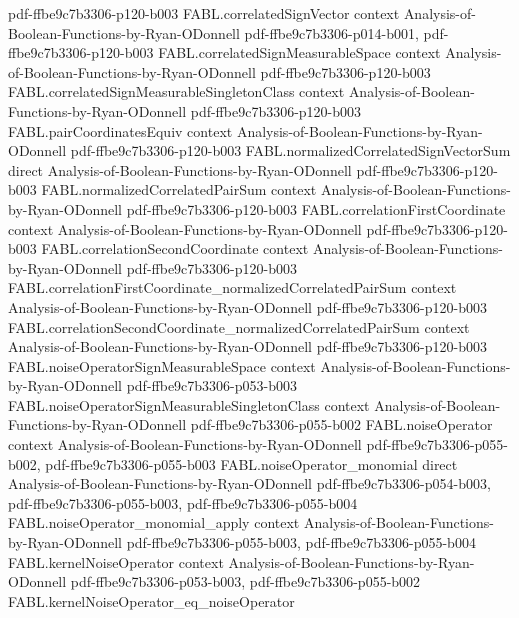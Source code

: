 \begin{theorem}
{    pdf-ffbe9c7b3306-p120-b003}
\proofstep
  {FABL.correlatedSignVector}
  {context}
  {Analysis-of-Boolean-Functions-by-Ryan-ODonnell}
  {pdf-ffbe9c7b3306-p014-b001,
    pdf-ffbe9c7b3306-p120-b003}
\proofstep
  {FABL.correlatedSignMeasurableSpace}
  {context}
  {Analysis-of-Boolean-Functions-by-Ryan-ODonnell}
  {pdf-ffbe9c7b3306-p120-b003}
\proofstep
  {FABL.correlatedSignMeasurableSingletonClass}
  {context}
  {Analysis-of-Boolean-Functions-by-Ryan-ODonnell}
  {pdf-ffbe9c7b3306-p120-b003}
\proofstep
  {FABL.pairCoordinatesEquiv}
  {context}
  {Analysis-of-Boolean-Functions-by-Ryan-ODonnell}
  {pdf-ffbe9c7b3306-p120-b003}
\proofstep
  {FABL.normalizedCorrelatedSignVectorSum}
  {direct}
  {Analysis-of-Boolean-Functions-by-Ryan-ODonnell}
  {pdf-ffbe9c7b3306-p120-b003}
\proofstep
  {FABL.normalizedCorrelatedPairSum}
  {context}
  {Analysis-of-Boolean-Functions-by-Ryan-ODonnell}
  {pdf-ffbe9c7b3306-p120-b003}
\proofstep
  {FABL.correlationFirstCoordinate}
  {context}
  {Analysis-of-Boolean-Functions-by-Ryan-ODonnell}
  {pdf-ffbe9c7b3306-p120-b003}
\proofstep
  {FABL.correlationSecondCoordinate}
  {context}
  {Analysis-of-Boolean-Functions-by-Ryan-ODonnell}
  {pdf-ffbe9c7b3306-p120-b003}
\proofstep
  {FABL.correlationFirstCoordinate_normalizedCorrelatedPairSum}
  {context}
  {Analysis-of-Boolean-Functions-by-Ryan-ODonnell}
  {pdf-ffbe9c7b3306-p120-b003}
\proofstep
  {FABL.correlationSecondCoordinate_normalizedCorrelatedPairSum}
  {context}
  {Analysis-of-Boolean-Functions-by-Ryan-ODonnell}
  {pdf-ffbe9c7b3306-p120-b003}
\proofstep
  {FABL.noiseOperatorSignMeasurableSpace}
  {context}
  {Analysis-of-Boolean-Functions-by-Ryan-ODonnell}
  {pdf-ffbe9c7b3306-p053-b003}
\proofstep
  {FABL.noiseOperatorSignMeasurableSingletonClass}
  {context}
  {Analysis-of-Boolean-Functions-by-Ryan-ODonnell}
  {pdf-ffbe9c7b3306-p055-b002}
\proofstep
  {FABL.noiseOperator}
  {context}
  {Analysis-of-Boolean-Functions-by-Ryan-ODonnell}
  {pdf-ffbe9c7b3306-p055-b002,
    pdf-ffbe9c7b3306-p055-b003}
\proofstep
  {FABL.noiseOperator_monomial}
  {direct}
  {Analysis-of-Boolean-Functions-by-Ryan-ODonnell}
  {pdf-ffbe9c7b3306-p054-b003,
    pdf-ffbe9c7b3306-p055-b003,
    pdf-ffbe9c7b3306-p055-b004}
\proofstep
  {FABL.noiseOperator_monomial_apply}
  {context}
  {Analysis-of-Boolean-Functions-by-Ryan-ODonnell}
  {pdf-ffbe9c7b3306-p055-b003,
    pdf-ffbe9c7b3306-p055-b004}
\proofstep
  {FABL.kernelNoiseOperator}
  {context}
  {Analysis-of-Boolean-Functions-by-Ryan-ODonnell}
  {pdf-ffbe9c7b3306-p053-b003,
    pdf-ffbe9c7b3306-p055-b002}
\proofstep
  {FABL.kernelNoiseOperator_eq_noiseOperator}

\end{theorem}
